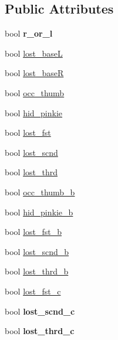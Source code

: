 \subsection*{Public Attributes}
\begin{DoxyCompactItemize}
\item 
\hypertarget{classFullhand_adfa61fb50125db0dbd152a5ccdc5210a}{
bool {\bfseries r\_\-or\_\-l}}
\label{classFullhand_adfa61fb50125db0dbd152a5ccdc5210a}

\item 
bool \hyperlink{classFullhand_a44fe7f34fc6bfcbd034d16b949ecf8b7}{lost\_\-baseL}
\item 
bool \hyperlink{classFullhand_a45a68f96640bf7207d6c2a58bd3ed834}{lost\_\-baseR}
\item 
bool \hyperlink{classFullhand_a9538ee796a33099f747d8972d9747816}{occ\_\-thumb}
\item 
bool \hyperlink{classFullhand_abfaffa48f3a18c954956cc9f97973d4d}{hid\_\-pinkie}
\item 
bool \hyperlink{classFullhand_aadb7136f7ce7e3a4a3ffb1188e7fb744}{lost\_\-fst}
\item 
bool \hyperlink{classFullhand_a3f1d564d16316785f7c94ee2c302e59f}{lost\_\-scnd}
\item 
bool \hyperlink{classFullhand_a26ec6d3639ec7cfa414d22f3ffc83663}{lost\_\-thrd}
\item 
bool \hyperlink{classFullhand_ae87bfe0cecb5ca9a366d7850c8c8bdd1}{occ\_\-thumb\_\-b}
\item 
bool \hyperlink{classFullhand_adddf4e45d1e336d48a7e0b8c0724979e}{hid\_\-pinkie\_\-b}
\item 
bool \hyperlink{classFullhand_aadd18a982717dfd5e7c10495db566752}{lost\_\-fst\_\-b}
\item 
bool \hyperlink{classFullhand_aaefe4741e3ddeb3fcb7525633df31fd0}{lost\_\-scnd\_\-b}
\item 
bool \hyperlink{classFullhand_a90731df9ecf27e13954ea3bea51dc5f2}{lost\_\-thrd\_\-b}
\item 
bool \hyperlink{classFullhand_a79d6ffa5c5dcd09ab56affa468b72b07}{lost\_\-fst\_\-c}
\item 
\hypertarget{classFullhand_a66f8383e88b30c3b5d430e062e014da1}{
bool {\bfseries lost\_\-scnd\_\-c}}
\label{classFullhand_a66f8383e88b30c3b5d430e062e014da1}

\item 
\hypertarget{classFullhand_aedaa0f5da2e827b3cb4ea1ad233a407e}{
bool {\bfseries lost\_\-thrd\_\-c}}
\label{classFullhand_aedaa0f5da2e827b3cb4ea1ad233a407e}


\end{DoxyCompactItemize}
